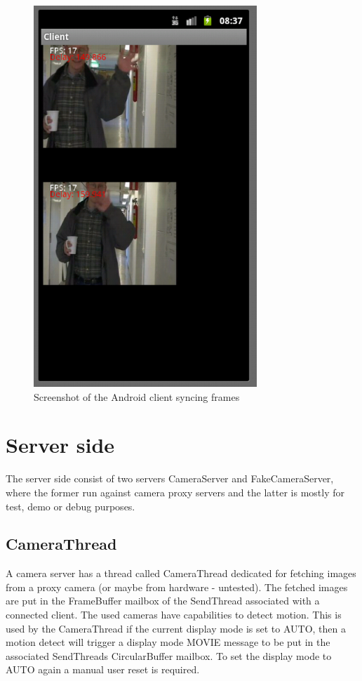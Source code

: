 \documentclass[8pt,titlepage]{article}
\begin{document}
\begin{figure}[hbp]
\includegraphics[width=0.75\textwidth]{../screenshots/androidSyncing.png}
\caption{Screenshot of the Android client syncing frames}
\end{figure}








\section{Server side}
The server side consist of two servers CameraServer and FakeCameraServer, where the former run against camera proxy servers and the latter is mostly for test, demo or debug purposes.



\subsection{CameraThread}
A camera server has a thread called CameraThread dedicated for fetching images from a proxy camera (or maybe from hardware - untested). The fetched images are put in the FrameBuffer mailbox of the SendThread associated with a connected client. The used cameras have capabilities to detect motion. This is used by the CameraThread if the current display mode is set to AUTO, then a motion detect will trigger a display mode MOVIE message to be put in the associated SendThreads CircularBuffer mailbox. To set the display mode to AUTO again a manual user reset is required. 
\end{document}

